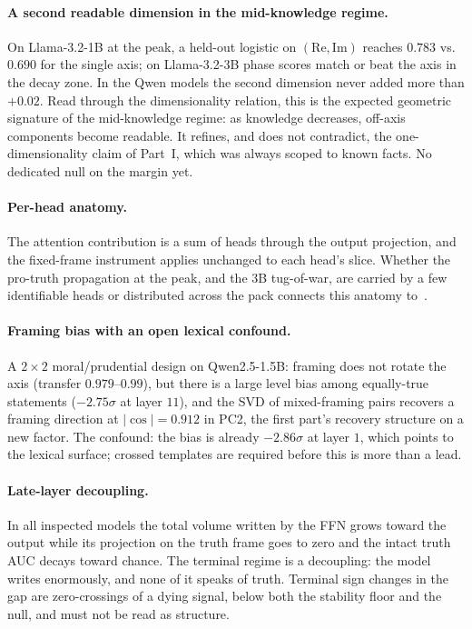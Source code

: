 \documentclass[11pt]{article}
\begin{document}
\paragraph{A second readable dimension in the mid-knowledge regime.} On
Llama-3.2-1B at the peak, a held-out logistic on $(\mathrm{Re},
\mathrm{Im})$ reaches $0.783$ vs.\ $0.690$ for the single axis; on
Llama-3.2-3B phase scores match or beat the axis in the decay zone. In the
Qwen models the second dimension never added more than $+0.02$. Read
through the dimensionality relation, this is the expected geometric
signature of the mid-knowledge regime: as knowledge decreases, off-axis
components become readable. It refines, and does not contradict, the
one-dimensionality claim of Part~I, which was always scoped to
known facts. No dedicated null on the margin yet.

\paragraph{Per-head anatomy.} The attention contribution is a sum of heads
through the output projection, and the fixed-frame instrument applies
unchanged to each head's slice. Whether the pro-truth propagation at the
peak, and the 3B tug-of-war, are carried by a few identifiable heads or
distributed across the pack connects this anatomy
to~\cite{headgenome}.

\paragraph{Framing bias with an open lexical confound.} A $2{\times}2$
moral/prudential design on Qwen2.5-1.5B: framing does not rotate the axis
(transfer $0.979$--$0.99$), but there is a large level bias among
equally-true statements ($-2.75\sigma$ at layer $11$), and the SVD of
mixed-framing pairs recovers a framing direction at $|\cos| = 0.912$ in
PC2, the first part's recovery structure on a new factor. The
confound: the bias is already $-2.86\sigma$ at layer $1$, which points to
the lexical surface; crossed templates are required before this is more
than a lead.

\paragraph{Late-layer decoupling.} In all inspected models the total
volume written by the FFN grows toward the output while its projection on
the truth frame goes to zero and the intact truth AUC decays toward
chance. The terminal regime is a decoupling: the model writes enormously,
and none of it speaks of truth. Terminal sign changes in the gap are
zero-crossings of a dying signal, below both the stability floor and the
null, and must not be read as structure.
\end{document}
